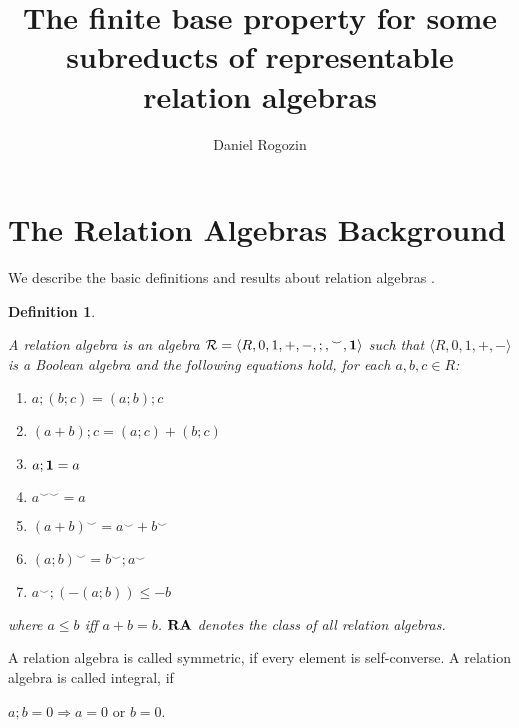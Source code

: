 \documentclass[a4paper]{article}
\author{Daniel Rogozin}
\date{}
\title{The finite base property for some subreducts of representable relation algebras}
\theoremstyle{defin}
\newtheorem{defin}{Definition}
\theoremstyle{theorem}
\theoremstyle{prop}
\theoremstyle{lemma}
\theoremstyle{ex}
\theoremstyle{col}
\theoremstyle{claim}
\begin{document}
\maketitle

\section{The Relation Algebras Background}

We describe the basic definitions and results about relation algebras \cite{hirsch2002relation} \cite{maddux2006relation}.

\begin{defin}
  $ $

    A relation algebra is an algebra $\mathcal{R} = \langle R, 0, 1, +, -, ;, {}^{\smile}, {\bf 1 }\rangle$ such that $\langle R, 0, 1, +, - \rangle$ is a Boolean algebra and the following
    equations hold, for each $a, b, c \in R$:
    \begin{enumerate}
      \item $a ; (b ; c) = (a ; b) ; c$
      \item $(a + b) ; c = (a ; c) + (b ; c)$
      \item $a ; {\bf 1} = a$
      \item $a^{\smile \smile} = a$
      \item $(a + b)^{\smile} = a^{\smile} + b^{\smile}$
      \item $(a ; b)^{\smile} = b^{\smile} ; a^{\smile}$
      \item $a^{\smile} ; (- (a ; b)) \leq - b$
    \end{enumerate}
    where $a \leq b$ iff $a + b = b$. ${\bf RA}$ denotes the class of all relation
    algebras.
\end{defin}
A relation algebra is called symmetric, if every element is self-converse. A relation algebra is called integral, if
\begin{center}
  $a ; b = 0 \Rightarrow a = 0 \text{ or } b = 0$.
\end{center}
\end{document}
